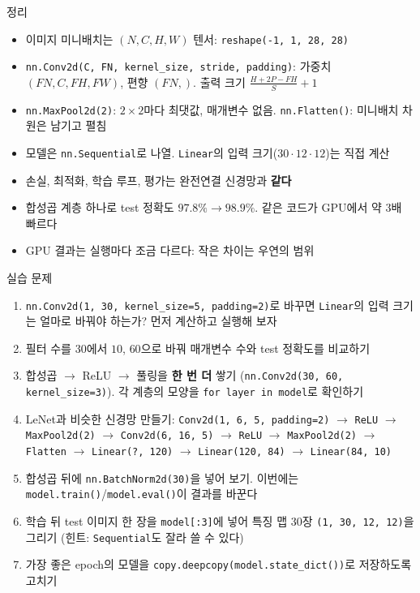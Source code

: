 \documentclass[aspectratio=169,11pt]{beamer}
\newcommand{\code}[1]{\texttt{#1}}
\begin{document}
\begin{frame}{정리}
\begin{keybox}[이번 시간의 핵심]
\small
\begin{itemize}\setlength{\itemsep}{0.6mm}
\item 이미지 미니배치는 $(N,C,H,W)$ 텐서: \code{reshape(-1, 1, 28, 28)}
\item \code{nn.Conv2d(C, FN, kernel\_size, stride, padding)}: 가중치 $(FN,C,FH,FW)$, 편향 $(FN,)$.
출력 크기 $\frac{H+2P-FH}{S}+1$
\item \code{nn.MaxPool2d(2)}: $2\times2$마다 최댓값, 매개변수 없음. \code{nn.Flatten()}: 미니배치 차원은 남기고 펼침
\item 모델은 \code{nn.Sequential}로 나열. \code{Linear}의 입력 크기($30\cdot12\cdot12$)는 직접 계산
\item 손실, 최적화, 학습 루프, 평가는 완전연결 신경망과 \textbf{같다}
\item 합성곱 계층 하나로 test 정확도 $97.8\%\to98.9\%$. 같은 코드가 GPU에서 약 $3$배 빠르다
\item GPU 결과는 실행마다 조금 다르다: 작은 차이는 우연의 범위
\end{itemize}
\end{keybox}
\end{frame}

\begin{frame}{실습 문제}
\small
\begin{enumerate}
\item \code{nn.Conv2d(1, 30, kernel\_size=5, padding=2)}로 바꾸면 \code{Linear}의 입력 크기는 얼마로 바꿔야 하는가? 먼저 계산하고 실행해 보자
\item 필터 수를 $30$에서 $10$, $60$으로 바꿔 매개변수 수와 test 정확도를 비교하기
\item 합성곱 $\to$ ReLU $\to$ 풀링을 \textbf{한 번 더} 쌓기 (\code{nn.Conv2d(30, 60, kernel\_size=3)}). 각 계층의 모양을 \code{for layer in model}로 확인하기
\item LeNet과 비슷한 신경망 만들기: \code{Conv2d(1, 6, 5, padding=2)} $\to$ \code{ReLU} $\to$ \code{MaxPool2d(2)} $\to$ \code{Conv2d(6, 16, 5)} $\to$ \code{ReLU} $\to$ \code{MaxPool2d(2)} $\to$ \code{Flatten} $\to$ \code{Linear(?, 120)} $\to$ \code{Linear(120, 84)} $\to$ \code{Linear(84, 10)}
\item 합성곱 뒤에 \code{nn.BatchNorm2d(30)}을 넣어 보기. 이번에는 \code{model.train()}/\code{model.eval()}이 결과를 바꾼다
\item 학습 뒤 test 이미지 한 장을 \code{model[:3]}에 넣어 특징 맵 30장 \code{(1, 30, 12, 12)}을 그리기 (힌트: \code{Sequential}도 잘라 쓸 수 있다)
\item 가장 좋은 epoch의 모델을 \code{copy.deepcopy(model.state\_dict())}로 저장하도록 고치기
\end{enumerate}
\end{frame}
\end{document}

